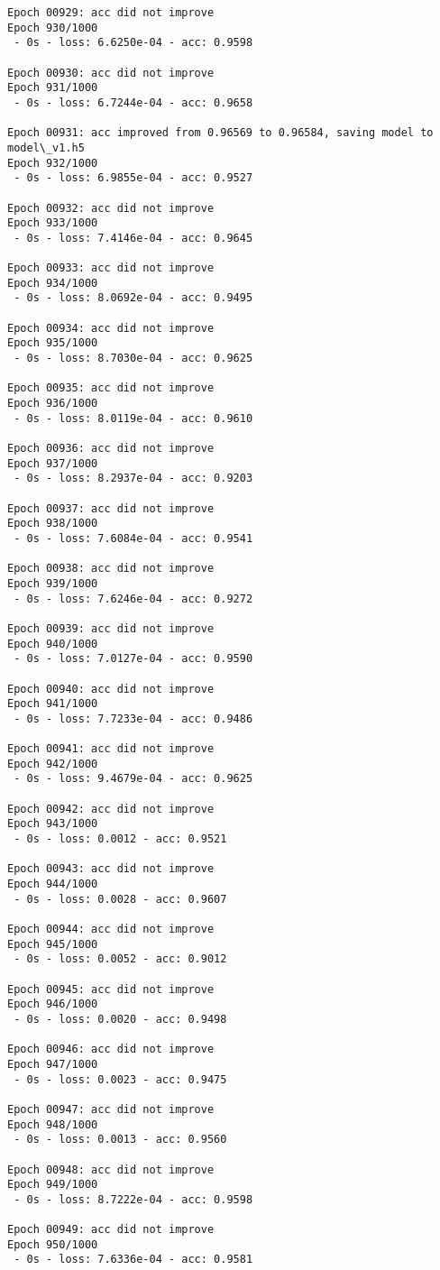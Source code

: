 \documentclass[11pt]{article}
\begin{document}
\begin{Verbatim}[commandchars=\\\{\}]
Epoch 00929: acc did not improve
Epoch 930/1000
 - 0s - loss: 6.6250e-04 - acc: 0.9598

Epoch 00930: acc did not improve
Epoch 931/1000
 - 0s - loss: 6.7244e-04 - acc: 0.9658

Epoch 00931: acc improved from 0.96569 to 0.96584, saving model to model\_v1.h5
Epoch 932/1000
 - 0s - loss: 6.9855e-04 - acc: 0.9527

Epoch 00932: acc did not improve
Epoch 933/1000
 - 0s - loss: 7.4146e-04 - acc: 0.9645

Epoch 00933: acc did not improve
Epoch 934/1000
 - 0s - loss: 8.0692e-04 - acc: 0.9495

Epoch 00934: acc did not improve
Epoch 935/1000
 - 0s - loss: 8.7030e-04 - acc: 0.9625

Epoch 00935: acc did not improve
Epoch 936/1000
 - 0s - loss: 8.0119e-04 - acc: 0.9610

Epoch 00936: acc did not improve
Epoch 937/1000
 - 0s - loss: 8.2937e-04 - acc: 0.9203

Epoch 00937: acc did not improve
Epoch 938/1000
 - 0s - loss: 7.6084e-04 - acc: 0.9541

Epoch 00938: acc did not improve
Epoch 939/1000
 - 0s - loss: 7.6246e-04 - acc: 0.9272

Epoch 00939: acc did not improve
Epoch 940/1000
 - 0s - loss: 7.0127e-04 - acc: 0.9590

Epoch 00940: acc did not improve
Epoch 941/1000
 - 0s - loss: 7.7233e-04 - acc: 0.9486

Epoch 00941: acc did not improve
Epoch 942/1000
 - 0s - loss: 9.4679e-04 - acc: 0.9625

Epoch 00942: acc did not improve
Epoch 943/1000
 - 0s - loss: 0.0012 - acc: 0.9521

Epoch 00943: acc did not improve
Epoch 944/1000
 - 0s - loss: 0.0028 - acc: 0.9607

Epoch 00944: acc did not improve
Epoch 945/1000
 - 0s - loss: 0.0052 - acc: 0.9012

Epoch 00945: acc did not improve
Epoch 946/1000
 - 0s - loss: 0.0020 - acc: 0.9498

Epoch 00946: acc did not improve
Epoch 947/1000
 - 0s - loss: 0.0023 - acc: 0.9475

Epoch 00947: acc did not improve
Epoch 948/1000
 - 0s - loss: 0.0013 - acc: 0.9560

Epoch 00948: acc did not improve
Epoch 949/1000
 - 0s - loss: 8.7222e-04 - acc: 0.9598

Epoch 00949: acc did not improve
Epoch 950/1000
 - 0s - loss: 7.6336e-04 - acc: 0.9581


\end{Verbatim}
\end{document}
